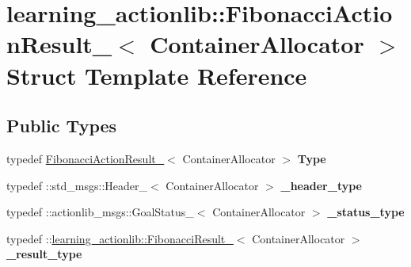 \hypertarget{structlearning__actionlib_1_1FibonacciActionResult__}{}\section{learning\+\_\+actionlib\+:\+:Fibonacci\+Action\+Result\+\_\+$<$ Container\+Allocator $>$ Struct Template Reference}
\label{structlearning__actionlib_1_1FibonacciActionResult__}
\subsection*{Public Types}
\begin{DoxyCompactItemize}
\item 
\mbox{\label{structlearning__actionlib_1_1FibonacciActionResult___addc326967a98bf3c35e3d519c3523420}} 
typedef \hyperlink{structlearning__actionlib_1_1FibonacciActionResult__}{Fibonacci\+Action\+Result\+\_\+}$<$ Container\+Allocator $>$ {\bfseries Type}
\item 
\mbox{\label{structlearning__actionlib_1_1FibonacciActionResult___a68c536d900888499569d866ac64a327d}} 
typedef \+::std\+\_\+msgs\+::\+Header\+\_\+$<$ Container\+Allocator $>$ {\bfseries \+\_\+header\+\_\+type}
\item 
\mbox{\label{structlearning__actionlib_1_1FibonacciActionResult___ae90ca6f258c6b161a9dcb346a4dc1217}} 
typedef \+::actionlib\+\_\+msgs\+::\+Goal\+Status\+\_\+$<$ Container\+Allocator $>$ {\bfseries \+\_\+status\+\_\+type}
\item 
\mbox{\label{structlearning__actionlib_1_1FibonacciActionResult___a1d4cca797bb85a44844834122724d016}} 
typedef \+::\hyperlink{structlearning__actionlib_1_1FibonacciResult__}{learning\+\_\+actionlib\+::\+Fibonacci\+Result\+\_\+}$<$ Container\+Allocator $>$ {\bfseries \+\_\+result\+\_\+type}
\item 
\mbox{\label{structlearning__actionlib_1_1FibonacciActionResult___ac68ff5bf20d03503da480d3f6424f4a9}} 

\end{DoxyCompactItemize}
